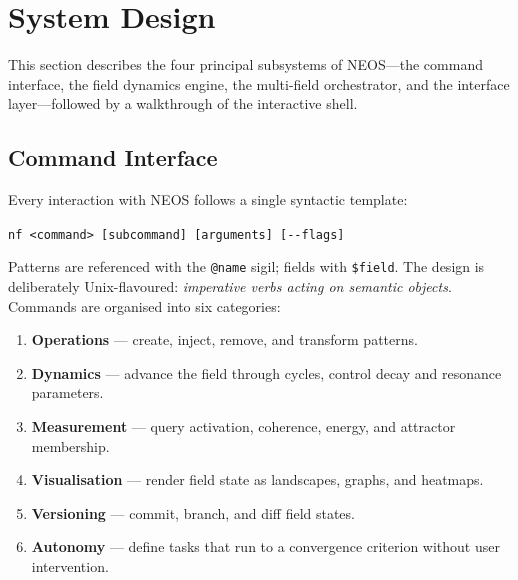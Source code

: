 
\section{System Design}\label{sec:system}

This section describes the four principal subsystems of NEOS---the
command interface, the field dynamics engine, the multi-field
orchestrator, and the interface layer---followed by a walkthrough of the
interactive shell.

\subsection{Command Interface}\label{sec:command-interface}

Every interaction with NEOS follows a single syntactic template:

\medskip
\begin{center}
\texttt{nf <command> [subcommand] [arguments] [-{}-flags]}
\end{center}
\medskip

\noindent
Patterns are referenced with the \texttt{@name} sigil; fields with
\texttt{\$field}.  The design is deliberately Unix-flavoured:
\emph{imperative verbs acting on semantic objects}.  Commands are
organised into six categories:

\begin{enumerate}[nosep]
  \item \textbf{Operations} --- create, inject, remove, and transform
        patterns.
  \item \textbf{Dynamics} --- advance the field through cycles, control
        decay and resonance parameters.
  \item \textbf{Measurement} --- query activation, coherence, energy,
        and attractor membership.
  \item \textbf{Visualisation} --- render field state as landscapes,
        graphs, and heatmaps.
  \item \textbf{Versioning} --- commit, branch, and diff field states.
  \item \textbf{Autonomy} --- define tasks that run to a convergence
        criterion without user intervention.
\end{enumerate}

